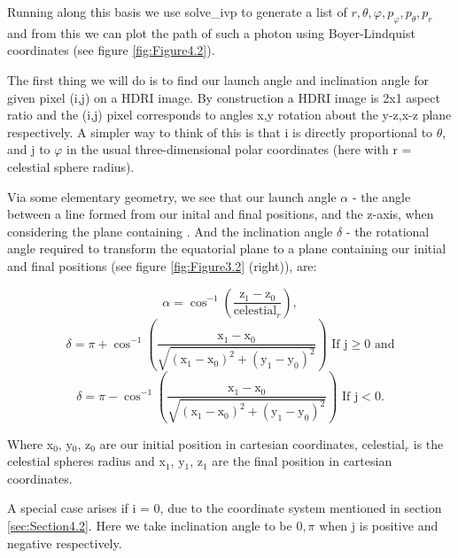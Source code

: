 \documentclass[oneside,openright,frontopenright, singlespacing]{dmathesis}
\begin{document}
\vspace{1em}
	Running along this basis we use solve\_ivp to generate a list of $r,\theta,\varphi,p_{\varphi},p_{\theta},p_{r}$ and from this we can plot the path of such a photon using Boyer-Lindquist coordinates (see figure \ref{fig:Figure4.2}).

\vspace{1em}
	The first thing we will do is to find our launch angle and inclination angle for given pixel (i,j) on a HDRI image. By construction a HDRI image is 2x1 aspect ratio and the (i,j) pixel corresponds to angles x,y rotation about the y-z,x-z plane respectively. A simpler way to think of this is that i is directly proportional to $\theta$, and j to $\varphi$ in the usual three-dimensional polar coordinates (here with r = celestial sphere radius).

\vspace{1em}
	Via some elementary geometry, we see that our launch angle $\alpha$ - the angle between a line formed from our inital and final positions, and the z-axis, when considering the plane containing . And the inclination angle $\delta$ - the rotational angle required to transform the equatorial plane to a plane containing our initial and final positions (see figure \ref{fig:Figure3.2} (right)), are:

\vspace{1em}
	\[\alpha = \cos^{-1}\left(\frac{\mbox{z}_1-\mbox{z}_0}{\mbox{celestial}_r}\right),\]
	\[\delta = \pi+\cos^{-1}\left(\frac{\mbox{x}_1-\mbox{x}_0}{\sqrt{(\mbox{x}_1-\mbox{x}_0)^2+(\mbox{y}_1-\mbox{y}_0)^2}}\right)\mbox{ If j}\geq0\mbox{ and} \]
	\[\delta = \pi-\cos^{-1}\left(\frac{\mbox{x}_1-\mbox{x}_0}{\sqrt{(\mbox{x}_1-\mbox{x}_0)^2+(\mbox{y}_1-\mbox{y}_0)^2}}\right)\mbox{ If j}<0.\]

\vspace{1em}
	Where x$_0$, y$_0$, z$_0$ are our initial position in cartesian coordinates, celestial$_r$ is the celestial spheres radius and x$_1$, y$_1$, z$_1$ are the final position in cartesian coordinates.

\vspace{1em}
	A special case arises if i = 0, due to the coordinate system mentioned in section \ref{sec:Section4.2}. Here we take inclination angle to be $0,\pi$ when j is positive and negative respectively.
\end{document}
